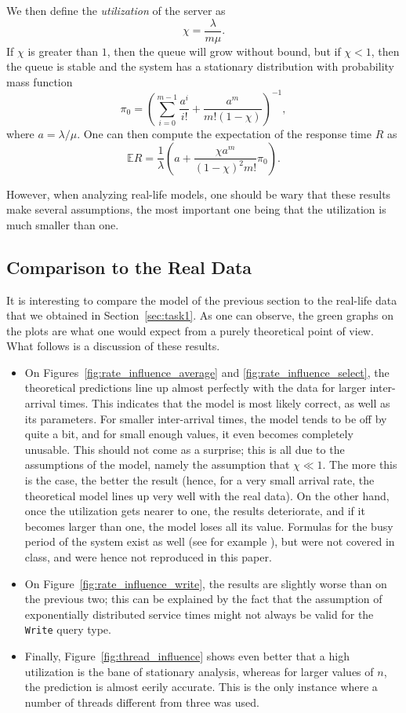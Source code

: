 \documentclass[journal]{IEEEtran}
\theoremstyle{definition}
\newcommand{\java}[1]{\texttt{#1}}
\begin{document}
We then define the \emph{utilization} of the server as
\[
\chi = \frac{\lambda}{m\mu}.
\]
If \(\chi\) is greater than \(1\), then the queue will grow without bound, but if \(\chi < 1\), then the queue is stable and the system has a stationary distribution with probability mass function
\[
\pi_{0} = \left(\sum_{i=0}^{m-1} \frac{a^i}{i!} + \frac{a^m}{m! (1 - \chi)}\right)^{-1},
\]
where \(a = \lambda/\mu\).
One can then compute the expectation of the response time \(R\) as
\begin{equation}
\mathbb{E}R = \frac{1}{\lambda} \left(a + \frac{\chi a^m}{(1 - \chi)^2 m!}\pi_{0}\right).
\end{equation}

However, when analyzing real-life models, one should be wary that these results make several assumptions, the most important one being that the utilization is much smaller than one.

\subsection{Comparison to the Real Data}
It is interesting to compare the model of the previous section to the real-life data that we obtained in Section~\ref{sec:task1}.
As one can observe, the green graphs on the plots are what one would expect from a purely theoretical point of view.
What follows is a discussion of these results.

\begin{itemize}
	\item On Figures~\ref{fig:rate_influence_average} and \ref{fig:rate_influence_select}, the theoretical predictions line up almost perfectly with the data for larger inter-arrival times.
	This indicates that the model is most likely correct, as well as its parameters.
	For smaller inter-arrival times, the model tends to be off by quite a bit, and for small enough values, it even becomes completely unusable.
	This should not come as a surprise; this is all due to the assumptions of the model, namely the assumption that \(\chi \ll 1\).
	The more this is the case, the better the result (hence, for a very small arrival rate, the theoretical model lines up very well with the real data).
	On the other hand, once the utilization gets nearer to one, the results deteriorate, and if it becomes larger than one, the model loses all its value.
	Formulas for the busy period of the system exist as well (see for example \cite{mmm}), but were not covered in class, and were hence not reproduced in this paper.
	\item On Figure~\ref{fig:rate_influence_write}, the results are slightly worse than on the previous two; this can be explained by the fact that the assumption of exponentially distributed service times might not always be valid for the \java{Write} query type.
	\item Finally, Figure~\ref{fig:thread_influence} shows even better that a high utilization is the bane of stationary analysis, whereas for larger values of \(n\), the prediction is almost eerily accurate.
	This is the only instance where a number of threads different from three was used.
\end{itemize}
\end{document}
